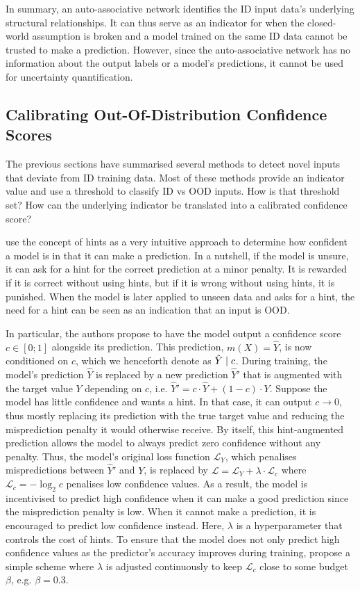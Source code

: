 In summary, an auto-associative network identifies the ID input data's underlying structural relationships. It can thus serve as an indicator for when the closed-world assumption is broken and a model trained on the same ID data cannot be trusted to make a prediction. However, since the auto-associative network has no information about the output labels or a model's predictions, it cannot be used for uncertainty quantification.

\subsection{Calibrating Out-Of-Distribution Confidence Scores}

The previous sections have summarised several methods to detect novel inputs that deviate from ID training data. Most of these methods provide an indicator value and use a threshold to classify ID vs OOD inputs. How is that threshold set? How can the underlying indicator be translated into a calibrated confidence score?

\newpar \textcite{learning-ood-confidence-2018} use the concept of hints as a very intuitive approach to determine how confident a model is in that it can make a prediction. In a nutshell, if the model is unsure, it can ask for a hint for the correct prediction at a minor penalty. It is rewarded if it is correct without using hints, but if it is wrong without using hints, it is punished. When the model is later applied to unseen data and asks for a hint, the need for a hint can be seen as an indication that an input is OOD.

In particular, the authors propose to have the model output a confidence score $c \in [0; 1]$ alongside its prediction. This prediction, $m(X) = \hat{Y}$, is now conditioned on $c$, which we henceforth denote as $\hat{Y} \mathrel{|} c$. During training, the model's prediction $\hat{Y}$ is replaced by a new prediction $\hat{Y}'$ that is augmented with the target value $Y$ depending on $c$, i.e. $\hat{Y}' = c \cdot \hat{Y} + (1-c) \cdot Y$. Suppose the model has little confidence and wants a hint. In that case, it can output $c \rightarrow 0$, thus mostly replacing its prediction with the true target value and reducing the misprediction penalty it would otherwise receive. By itself, this hint-augmented prediction allows the model to always predict zero confidence without any penalty. Thus, the model's original loss function $\mathcal{L}_Y$, which penalises mispredictions between $\hat{Y}'$ and $Y$, is replaced by $\mathcal{L} = \mathcal{L}_Y + \lambda \cdot \mathcal{L}_c$ where $\mathcal{L}_{c} = - \log_{2}{c}$ penalises low confidence values. As a result, the model is incentivised to predict high confidence when it can make a good prediction since the misprediction penalty is low. When it cannot make a prediction, it is encouraged to predict low confidence instead. Here, $\lambda$ is a hyperparameter that controls the cost of hints. To ensure that the model does not only predict high confidence values as the predictor's accuracy improves during training, \citeauthor{learning-ood-confidence-2018} propose a simple scheme where $\lambda$ is adjusted continuously to keep $\mathcal{L}_c$ close to some budget $\beta$, e.g. $\beta = 0.3$. 

